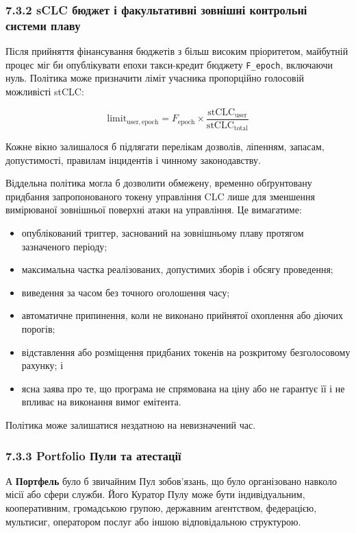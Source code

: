 \documentclass[11pt]{article}
\begin{document}
\subsubsection*{7.3.2 sCLC бюджет і факультативні зовнішні контрольні системи плаву}

Після прийняття фінансування бюджетів з більш високим пріоритетом, майбутній процес міг би опублікувати епохи такси-кредит бюджету \texttt{F\_epoch}, включаючи нуль. Політика може призначити ліміт учасника пропорційно голосовій можливісті stCLC:

\[
\mathrm{limit}_{\mathrm{user,epoch}} = F_{\mathrm{epoch}} \times \frac{\mathrm{stCLC}_{\mathrm{user}}}{\mathrm{stCLC}_{\mathrm{total}}}
\]

Кожне вікно залишалося б підлягати перелікам дозволів, ліпенням, запасам, допустимості, правилам інцидентів і чинному законодавству.

Віддельна політика могла б дозволити обмежену, временно обґрунтовану придбання запропонованого токену управління CLC лише для зменшення вимірюваної зовнішньої поверхні атаки на управління. Це вимагатиме:

\begin{itemize}[leftmargin=*]
\item опублікований триггер, заснований на зовнішньому плаву протягом зазначеного періоду;
\item максимальна частка реалізованих, допустимих зборів і обсягу проведення;
\item виведення за часом без точного оголошення часу;
\item автоматичне припинення, коли не виконано прийнятої охоплення або діючих порогів;
\item відставлення або розміщення придбаних токенів на розкритому безголосовому рахунку; і
\item ясна заява про те, що програма не спрямована на ціну або не гарантує її і не впливає на виконання вимог емітента.
\end{itemize}
Політика може залишатися нездатною на невизначений час.

\subsubsection*{7.3.3 Portfolio Пули та атестації}

А \textbf{Портфель} було б звичайним Пул зобов'язань, що було організовано навколо місії або сфери служби. Його Куратор Пулу може бути індивідуальним, кооперативним, громадською групою, державним агентством, федерацією, мультисиг, оператором послуг або іншою відповідальною структурою.
\end{document}

